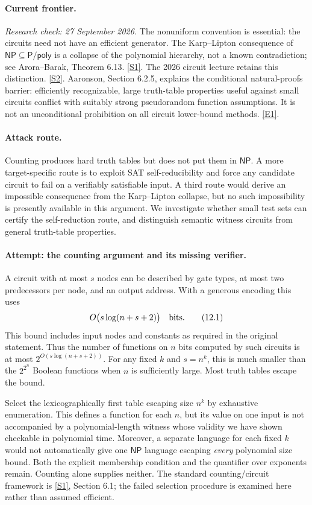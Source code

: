 \documentclass[11pt,a4paper]{article}
\newcommand{\sref}[2]{\hyperlink{source:#1:#2}{[S#2]}}
\newcommand{\eref}[2]{\hyperlink{extra:#1:#2}{[E#2]}}
\begin{document}
\paragraph{Current frontier.}
\textit{Research check: 27 September 2026.}
The nonuniform convention is essential: the circuits need not have an
efficient generator. The Karp--Lipton consequence of
$\mathsf{NP}\subseteq\mathsf{P/poly}$ is a collapse of the polynomial
hierarchy, not a known contradiction; see Arora--Barak, Theorem 6.13.
\sref{statement}{1}. The 2026 circuit lecture retains this distinction.
\sref{statement}{2}. Aaronson, Section 6.2.5, explains the conditional natural-proofs
barrier: efficiently recognizable, large truth-table properties useful
against small circuits conflict with suitably strong pseudorandom
function assumptions. It is not an unconditional prohibition on all
circuit lower-bound methods. \eref{statement}{1}.

\paragraph{Attack route.}
Counting produces hard truth tables but does not put them in $\mathsf{NP}$.
A more target-specific route is to exploit SAT self-reducibility and
force any candidate circuit to fail on a verifiably satisfiable input.
A third route would derive an impossible consequence from the
Karp--Lipton collapse, but no such impossibility is presently available
in this argument. We investigate whether small test sets can certify
the self-reduction route, and distinguish semantic witness circuits
from general truth-table properties.

\paragraph{Attempt: the counting argument and its missing verifier.}
A circuit with at most $s$ nodes can be described by gate types, at most
two predecessors per node, and an output address. With a generous
encoding this uses
\[
 O\bigl(s\log(n+s+2)\bigr)\quad\hbox{bits}. \tag{12.1}
\]
This bound includes input nodes and constants as required in the original
statement. Thus the number of functions on $n$ bits computed by such
circuits is at most $2^{O(s\log(n+s+2))}$. For any fixed $k$ and
$s=n^k$, this is much smaller than the $2^{2^n}$ Boolean functions when
$n$ is sufficiently large. Most truth tables escape the bound.

Select the lexicographically first table escaping size $n^k$ by exhaustive
enumeration. This defines a function for each $n$, but its value on one
input is not accompanied by a polynomial-length witness whose validity
we have shown checkable in polynomial time. Moreover, a separate language
for each fixed $k$ would not automatically give one $\mathsf{NP}$ language
escaping \emph{every} polynomial size bound. Both the explicit membership
condition and the quantifier over exponents remain. Counting alone
supplies neither. The standard counting/circuit framework is
\sref{statement}{1}, Section 6.1; the failed selection procedure is examined
here rather than assumed efficient.
\end{document}
